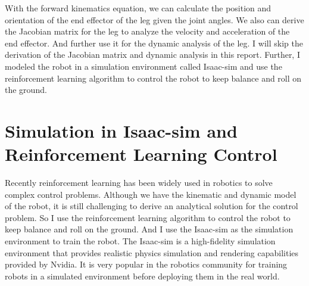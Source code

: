 \documentclass{article}
\begin{document}
With the forward kinematics equation, we can calculate the position and orientation of the end effector of the leg given the joint angles. 
We also can derive the Jacobian matrix for the leg to analyze the velocity and acceleration of the end effector. And further use it for the dynamic analysis of the leg.
I will skip the derivation of the Jacobian matrix and dynamic analysis in this report.
Further, I modeled the robot in a simulation environment called Isaac-sim and use the reinforcement learning algorithm to control the robot to keep balance and roll on the ground.

\section*{Simulation in Isaac-sim and Reinforcement Learning Control}
Recently reinforcement learning\cite{kaelbling1996reinforcement} has been widely used in robotics to solve complex control problems.\cite{hoeller2024anymal} Although we have the kinematic and dynamic model of the robot, 
it is still challenging to derive an analytical solution for the control problem. So I use the reinforcement learning algorithm to control the robot to keep balance and roll on the ground.
And I use the Isaac-sim as the simulation environment to train the robot.\cite{web:isaac-sim}\cite{mittal2023orbit} The Isaac-sim is a high-fidelity simulation environment that provides realistic physics simulation and rendering capabilities provided by Nvidia.
It is very popular in the robotics community for training robots in a simulated environment before deploying them in the real world.\cite{kumar2021workflow}
\end{document}
